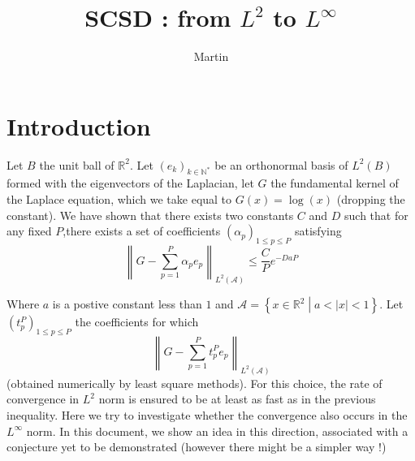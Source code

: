 \documentclass[11pt,a4paper]{article}
\title{SCSD : from $L^2$ to $L^\infty$}
\author{Martin}
\begin{document}
\renewcommand{\proofname}{Proof}
\maketitle
\theoremstyle{plain}
\newtheorem{The}{Theorem}[section]
\newtheorem{Conj}{Conjecture}[section]
\newtheorem{Prop}{Proposition}[section]
\newtheorem{Cor}{Corollary}[section]
\newtheorem{Lem}{Lemme}[section]
\theoremstyle{definition}
\newtheorem{Def}{Definition}[section]
\newtheorem{Rem}{Remark}[section]
\newcommand{\enstq}[2]{\left\{#1\mathrel{}\middle|\mathrel{}#2\right\}}
\newcommand{\Lp}[2]{L^#1(#2)}
\newcommand{\Sob}[3]{W^{#1,#2}(#3)}
\newcommand{\RN}[0]{\mathbb{R}^N}
\newcommand{\norm}[1]{\left\|#1\right\|}
\newcommand{\sinc}[0]{\textup{sinc}}
\newcommand{\functionDef}[5]{\begin{array}{lllll}
#1 & : & #2 & \longrightarrow & #3 \\
 & & #4 & \longmapsto &\displaystyle #5 \\
\end{array}}
\newcommand{\N}{\mathbb{N}}
\newcommand{\Z}{\mathbb{Z}}
\newcommand{\D}{\mathbb{D}}
\newcommand{\R}{\mathbb{R}}
\newcommand{\A}{\mathcal{A}_{a,b}}
\newcommand{\Crad}{C^\infty_{c,rad}(B)}
\newcommand{\Lrad}{L^2_{rad}(B)}
\newcommand{\Lradab}{L^2_{rad}(\mathcal{A}_{a,b})}
\newcommand{\duality}[2]{\left\langle #1,#2\right\rangle}
\newcommand{\Hrad}{H^1_{rad}(B)}
\newcommand{\Hzrad}{H^1_{0,rad}(B)}


\section{Introduction}

Let $B$ the unit ball of $\mathbb{R}^2$. Let $(e_k)_{k \in \mathbb{N}^*}$ be an orthonormal basis of $L^2(B)$ formed with the eigenvectors of the Laplacian, let $G$ the fundamental kernel of the Laplace equation, which we take equal to $G(x) = \log(x)$ (dropping the constant). We have shown that there exists two constants $C$ and $D$ such that for any fixed $P$,there exists a set of coefficients $\left(\alpha_p\right)_{1\leq p \leq P}$ satisfying
\begin{equation}
\norm{G- \sum_{p=1}^P \alpha_p e_p}_{L^2(\mathcal{A})} \leq \frac{C}{P} e^{-DaP}
\label{estimation}
\end{equation}

Where $a$ is a postive constant less than $1$ and $\mathcal{A} = \enstq{x \in \mathbb{R}^2}{a<|x|<1}$. Let $(t_p^P)_{1\leq p \leq P}$ the coefficients for which \[\norm{G- \sum_{p=1}^P t_p^P e_p}_{L^2(\mathcal{A})}\] (obtained numerically by least square methods). For this choice, the rate of convergence in $L^2$ norm is ensured to be at least as fast as in the previous inequality. Here we try to investigate whether the convergence also occurs in the $L^\infty$ norm. In this document, we show an idea in this direction, associated with a conjecture yet to be demonstrated (however there might be a simpler way !)
\end{document}

